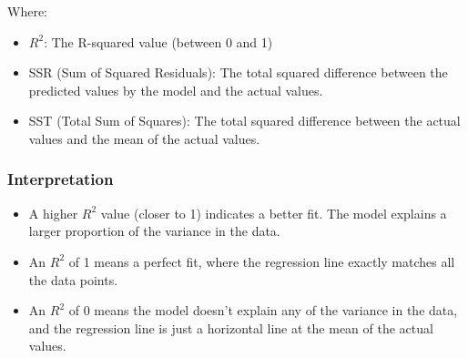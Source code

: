 Where:
\begin{itemize}
    \item $R^2$: The R-squared value (between 0 and 1)
    \item SSR (Sum of Squared Residuals): The total squared difference between the predicted values by the model and the actual values.
    \item SST (Total Sum of Squares): The total squared difference between the actual values and the mean of the actual values.
\end{itemize}

\subsubsection{Interpretation}
\begin{itemize}
    \item A higher $R^2$ value (closer to 1) indicates a better fit. The model explains a larger proportion of the variance in the data.
    \item An $R^2$ of 1 means a perfect fit, where the regression line exactly matches all the data points.
    \item An $R^2$ of 0 means the model doesn't explain any of the variance in the data, and the regression line is just a horizontal line at the mean of the actual values.
\end{itemize}

